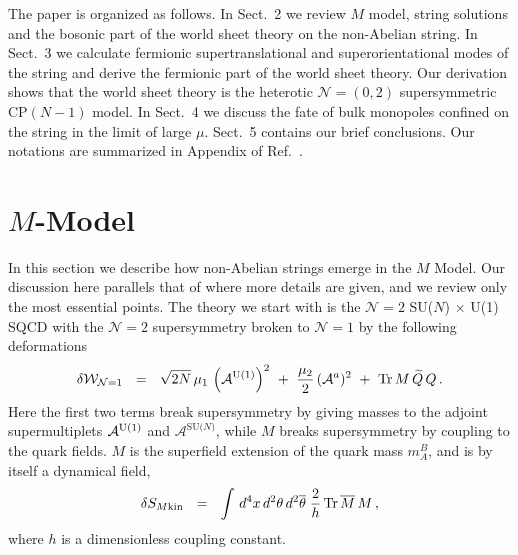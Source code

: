 \documentclass[12pt]{article}
\def\beq{\begin{equation}}
\def\eeq{\end{equation}}
\def\Tr{{\rm Tr}}
\newcommand{\ntwo}{${\mathcal N}=2$ }
\newcommand{\ntwoo}{${\mathcal N}= \left(0,2\right) $ }
\newcommand{\none}{${\mathcal N}=1$ }
\newcommand{\wt}{\widetilde}
\newcommand{\ov}{\overline}
\newcommand{\mc}[1]{\mathcal{#1}}
\newcommand{\sunu}{{\rm SU($N$) $\times$ U(1) }}
\begin{document}




The paper is organized as follows. In Sect.~2 we review $M$ model, string solutions and 
the bosonic part of the world sheet theory on the non-Abelian string. In Sect.~3 we calculate
fermionic supertranslational and superorientational modes of the string and derive
the fermionic part of the world sheet theory. Our derivation shows that the world sheet theory is
the  heterotic \ntwoo supersymmetric CP$(N-1)$ model. In Sect.~4 we discuss the fate of bulk monopoles
confined on the string in the limit of large $\mu$. Sect.~5 contains our brief conclusions.
Our notations are summarized  in Appendix of Ref.~\cite{BSYhet}.





%
%


%
%
\section{{\boldmath $M$}-Model}
\setcounter{equation}{0}

In this section we describe how non-Abelian strings emerge in the $M$ Model.
Our discussion here parallels that of \cite{GSYmmodel} where more details are
given, and we review only the most essential points.
The theory we start with is the \ntwo \sunu SQCD with the \ntwo supersymmetry
broken to \none by the following deformations
\beq
\label{none}
	\delta\mc{W}_{\mc{N}=1} ~~=~~ \sqrt{2N}\,\mu_1\, \left( \mc{A}^{\rm U(1)} \right)^2 
				~+~ \frac{\mu_2}{2}\, (\mc{A}^a)^2
				~+~ \Tr\, M\, \wt{Q}\, Q\,.
\eeq
Here the first two terms break supersymmetry by giving masses to the adjoint 
supermultiplets $ \mc{A}^{\rm U(1)} $ and $ \mc{A}^\text{SU($N$)} $, 
while $ M $ breaks supersymmetry by coupling to the quark fields.
$ M $ is the superfield extension of the quark mass $ m_A^B $, and is by itself a dynamical field,
\[
	\delta S_{M \rm kin} ~~=~~ \int\, d^4x\, d^2\theta\, d^2\ov{\theta} \;
					\frac{2}{h}\, \Tr\, \ov{M}\, M \,,
\]
where $ h $ is a dimensionless coupling constant. 
\end{document}

